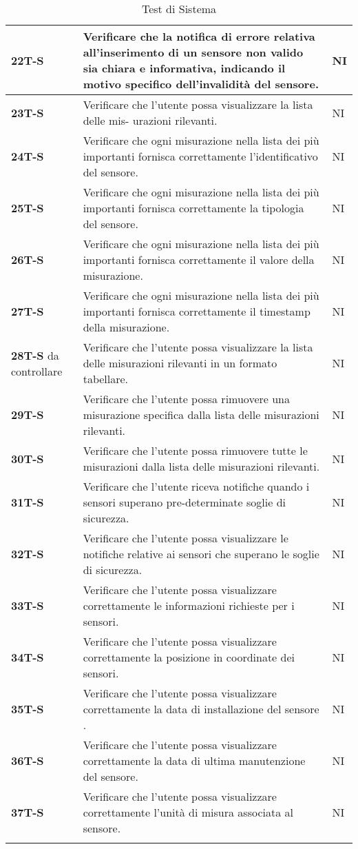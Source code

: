 \begin{longtable}{|>{\raggedright\arraybackslash}m{}|>{\raggedright\arraybackslash}m{}|>{\raggedright\arraybackslash}m{}|}
	\hline
	\textbf{22T-S}   & Verificare che la notifica di errore relativa all’inserimento di un sensore non valido sia chiara e informativa, indicando il motivo specifico dell’invalidità del sensore. & NI\\
	\hline
	\textbf{23T-S}   & Verificare che l’utente possa visualizzare la lista delle mis- urazioni rilevanti. & NI\\
	\hline
	\textbf{24T-S}   & Verificare che ogni misurazione nella lista dei più importanti fornisca correttamente l’identificativo del sensore. & NI\\
	\hline
	\textbf{25T-S}   & Verificare che ogni misurazione nella lista dei più importanti fornisca correttamente la tipologia del sensore. & NI\\
	\hline
	\textbf{26T-S}   & Verificare che ogni misurazione nella lista dei più importanti fornisca correttamente il valore della misurazione. & NI\\
	\hline
	\textbf{27T-S}   & Verificare che ogni misurazione nella lista dei più importanti fornisca correttamente il timestamp della misurazione. & NI\\
	\hline
	\textbf{28T-S} da controllare  & Verificare che l’utente possa visualizzare la lista delle misurazioni rilevanti in un formato tabellare. & NI\\
	\hline
	\textbf{29T-S}   & Verificare che l’utente possa rimuovere una misurazione specifica dalla lista delle misurazioni rilevanti. & NI\\
	\hline
	\textbf{30T-S}   & Verificare che l’utente possa rimuovere tutte le misurazioni dalla lista delle misurazioni rilevanti. & NI\\
	\hline
	\textbf{31T-S}   & Verificare che l’utente riceva notifiche quando i sensori superano pre-determinate soglie di sicurezza. & NI\\
	\hline
	\textbf{32T-S}   & Verificare che l’utente possa visualizzare le notifiche relative ai sensori che superano le soglie di sicurezza. & NI\\
	\hline
	\textbf{33T-S}   & Verificare che l’utente possa visualizzare correttamente le informazioni richieste per i sensori. & NI\\
	\hline
	\textbf{34T-S}   & Verificare che l’utente possa visualizzare correttamente la posizione in coordinate dei sensori. & NI\\
	\hline
	\textbf{35T-S}   & Verificare che l’utente possa visualizzare correttamente la data di installazione del sensore . & NI\\
	\hline
	\textbf{36T-S}   & Verificare che l’utente possa visualizzare correttamente la data di ultima manutenzione del sensore. & NI\\
	\hline
	\textbf{37T-S}   & Verificare che l’utente possa visualizzare correttamente l’unità di misura associata al sensore. & NI\\
	\hline
	\caption{Test di Sistema} %
	\label{table:14}
\end{longtable}


